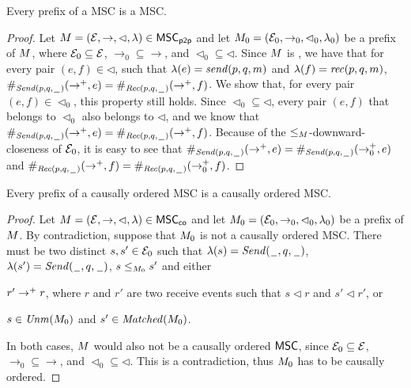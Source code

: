 \documentclass{article}
\begin{document}
\begin{lemma}
	\label{lem:p2p-prefix}
	Every prefix of a \pp MSC is a \pp MSC.
\end{lemma}
\begin{proof}
Let $\msc = (\Events, \procrel, \lhd, \lambda) \in \ppMSCs$ and let $\msc_0 =
(\Events_0, \procrel_0, \lhd_0, \lambda_0)$ be a prefix of $\msc$, where $\Events_0 \subseteq \Events$, ${\rightarrow_0} \subseteq {\rightarrow}$, and ${\lhd_0} \subseteq {\lhd}$. Since $\msc$ is \pp, we have that for every pair $(e,f) \in {\lhd}$, such that $\lambda(e) = \sact{p}{q}{\msg}$ and $\lambda(f) = \ract{p}{q}{\msg}$, $\sametype{e}{\pqsAct{p}{q}}{\procrel^+} = \sametype{f}{\pqrAct{p}{q}}{\procrel^+}$. We show that, for every pair $(e,f) \in {\lhd_0}$, this property still holds. 
Since  ${\lhd_0} \subseteq {\lhd}$, every pair $(e,f)$ that belongs to $\lhd_0$ also belongs to $\lhd$, and we know that $\sametype{e}{\pqsAct{p}{q}}{\procrel^+} = \sametype{f}{\pqrAct{p}{q}}{\procrel^+}$. 
Because of the $\le_\msc$-downward-closeness of $\Events_0$, it is easy to see that $\sametype{e}{\pqsAct{p}{q}}{\procrel^+}=\sametype{e}{\pqsAct{p}{q}}{\procrel_0^+}$ and $\sametype{f}{\pqrAct{p}{q}}{\procrel^+}=\sametype{f}{\pqrAct{p}{q}}{\procrel_0^+}$.
\end{proof}

\begin{lemma}
\label{lem:co-prefix}
Every prefix of a causally ordered MSC is a causally ordered MSC.
\end{lemma}
\begin{proof}
Let $\msc = (\Events, \procrel, \lhd, \lambda) \in \coMSCs$ and let $\msc_0 =
(\Events_0, \procrel_0, \lhd_0, \lambda_0)$ be a prefix of $\msc$. By contradiction, suppose that $\msc_0$ is not a	causally ordered MSC. There must be two distinct $s,s' \in \Events_0$ such that $\lambda(s)=\pqsAct{\plh}{q}$, $\lambda(s')=\pqsAct{\plh}{q}$, $s \le_{\msc_0} s'$ and either
\begin{enumerate*}[label={(\roman*)}]
	\item $r' \procrel^+ r$, where $r$ and $r'$ are two receive events such that $s \lhd r$ and $s' \lhd r'$, or
	\item $s \in \Unm{\msc_0}$ and $s' \in \Matched{\msc_0}$.
\end{enumerate*}
In both cases, $\msc$ would also not be a causally ordered $\MSCs$, since $\Events_0 \subseteq \Events$, ${\rightarrow_0} \subseteq {\rightarrow}$, and ${\lhd_0} \subseteq {\lhd}$. This is a contradiction, thus $\msc_0$ has to be causally ordered.
\end{proof}
\end{document}
